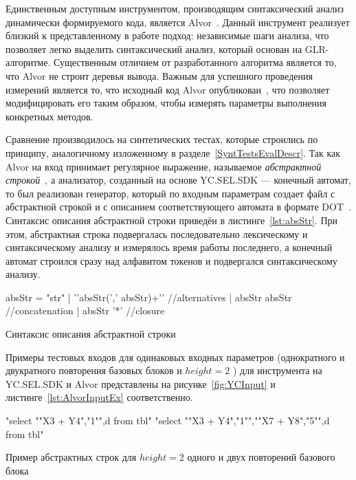 Единственным доступным инструментом, производящим синтаксический анализ динамически формируемого кода, является Alvor~\cite{Alvor1, Alvor2}. Данный инструмент реализует  близкий к представленному в работе подход: независимые шаги анализа, что позволяет легко выделить синтаксический анализ, который основан на GLR-алгоритме. Существенным отличием от разработанного алгоритма является то, что Alvor не строит деревья вывода. Важным для успешного проведения измерений является то, что исходный код Alvor опубликован~\cite{AlvorUrl}, что позволяет модифицировать его таким образом, чтобы измерять параметры выполнения конкретных методов. 

Сравнение производилось на синтетических тестах, которые строились по принципу, аналогичному изложенному в разделе~\ref{SyntTestsEvalDescr}. Так как Alvor на вход принимает регулярное выражение, называемое \textit{абстрактной строкой}~\cite{Alvor2}, а анализатор, созданный на основе YC.SEL.SDK --- конечный автомат, то был реализован генератор, который по входным параметрам создает файл с абстрактной строкой и с описанием соответствующего автомата в формате DOT~\cite{DOT}. Синтаксис описания абстрактной строки приведён в листинге~\ref{lst:absStr}. При этом, абстрактная строка подвергалась последовательно лексическому и синтаксическому анализу и измерялось время работы последнего, а конечный автомат строился сразу над алфавитом токенов и подвергался синтаксическому анализу.

\begin{listing}
    \begin{pyglist}[numbers=left,numbersep=5pt]
absStr = "str"
       | '{'absStr(',' absStr)+'}' //alternatives
       | absStr absStr             //concatenation
       | absStr '*'                //closure
\end{pyglist}
\caption{Синтаксис описания абстрактной строки}
\label{lst:absStr}
\end{listing}

 
Примеры тестовых входов для одинаковых входных параметров (однократного и двукратного повторения базовых блоков и $height=2$ ) для инструмента на YC.SEL.SDK и Alvor представлены на рисунке~\ref{fig:YCInput} и листинге~\ref{lst:AlvorInputEx}  соответственно. 

\begin{listing}
    \begin{pyglist}[numbers=left,numbersep=5pt]
"select "{"X3 + Y4","1"}",d from tbl"
"select "{"X3 + Y4","1"}","{"X7 + Y8","5"}",d from tbl"
\end{pyglist}
\caption{Пример абстрактных строк для $height=2$ одного и двух повторений базового блока}
\label{lst:AlvorInputEx}
\end{listing}

